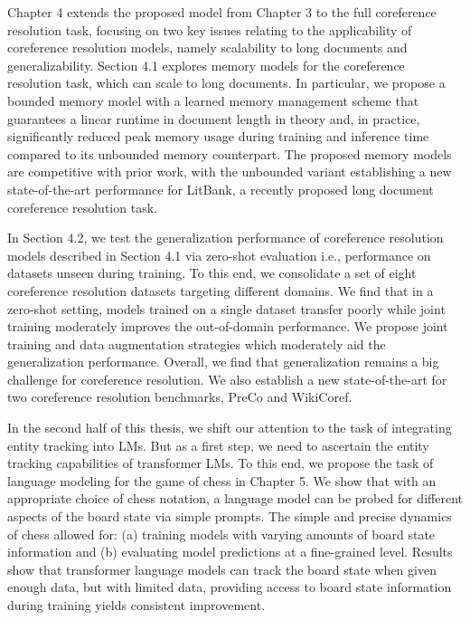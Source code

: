 \documentclass[12pt]{thesis-umich}[thesis]
\begin{document}
Chapter 4 extends the proposed model from Chapter 3 to the full coreference resolution task, focusing on two key issues relating to the applicability of coreference resolution models, namely scalability to long documents and generalizability. Section 4.1 explores memory models for the coreference resolution task, which can scale to long documents. In particular, we propose a bounded memory model with a learned memory management scheme that guarantees a linear runtime in document length in theory and, in practice, significantly reduced peak memory usage during training and inference time compared to its unbounded memory counterpart. The proposed memory models are competitive with prior work, with the unbounded variant establishing a new state-of-the-art performance for LitBank, a recently proposed long document coreference resolution task. 

In Section 4.2, we test the generalization performance of coreference resolution models described in Section 4.1 via zero-shot evaluation i.e., performance on datasets unseen during training. To this end, we consolidate a set of eight coreference resolution datasets targeting different domains. 
We find that in a zero-shot setting, models trained on a single dataset transfer poorly while joint training moderately improves the out-of-domain performance.  
We propose joint training and data augmentation strategies which moderately aid the generalization performance. 
Overall, we find that generalization remains a big challenge for coreference resolution. 
We also establish a new state-of-the-art for two coreference resolution benchmarks, PreCo and WikiCoref. 


In the second half of this thesis, we shift our attention to the task of integrating entity tracking into LMs. But as a first step, we need to ascertain the entity tracking capabilities of transformer LMs. 
To this end, we propose the task of language modeling for the game of chess in Chapter 5.  
We show that with an appropriate choice of chess notation, a language model can be probed for different aspects of the board state via simple prompts.
The simple and precise dynamics of chess allowed for: (a) training models with varying amounts of board state information and (b) evaluating model predictions at a fine-grained level.
Results show that transformer language models can track the board state when given enough
data, but with limited data, providing access to board state information during training yields consistent improvement. 
\end{document}
